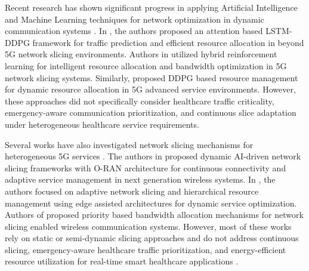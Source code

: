 \documentclass[10pt,journal,compsoc]{IEEEtran}
\begin{document}
Recent research has shown significant progress in applying Artificial Intelligence and Machine Learning techniques for network optimization in dynamic communication systems \cite{hurtado2022drlsurvey,dubey2024ai,helmy2025slicing}. In \cite{kumar2025lstmddpg}, the authors proposed an attention based LSTM-DDPG framework for traffic prediction and efficient resource allocation in beyond 5G network slicing environments. Authors in \cite{saleh2025hybridrl,narode2025resource,yu2026dynamic} utilized hybrid reinforcement learning for intelligent resource allocation and bandwidth optimization in 5G network slicing systems. Similarly, \cite{tariq2025ddpgv2x,yang2025ddpg} proposed DDPG based resource management for dynamic resource allocation in 5G advanced service environments. However, these approaches did not specifically consider healthcare traffic criticality, emergency-aware communication prioritization, and continuous slice adaptation under heterogeneous healthcare service requirements.

Several works have also investigated network slicing mechanisms for heterogeneous 5G services \cite{wijethilaka2021iotslicing}. The authors in \cite{shah2025oran,ari2025iot5g,zhang2026trustaware} proposed dynamic AI-driven network slicing frameworks with O-RAN architecture for continuous connectivity and adaptive service management in next generation wireless systems. In \cite{zheng2025eamem}, the authors focused on adaptive network slicing and hierarchical resource management using edge assisted architectures for dynamic service optimization. Authors of \cite{sarker2026prioritybw} proposed priority based bandwidth allocation mechanisms for network slicing enabled wireless communication systems. However, most of these works rely on static or semi-dynamic slicing approaches and do not address continuous slicing, emergency-aware healthcare traffic prioritization, and energy-efficient resource utilization for real-time smart healthcare applications \cite{sun2025xai6g}.
\end{document}

